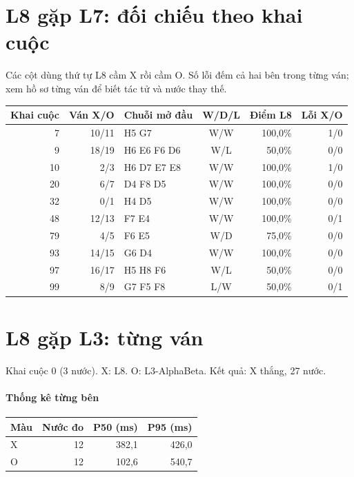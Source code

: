 \section{L8 gặp L7: đối chiếu theo khai cuộc}
Các cột dùng thứ tự L8 cầm X rồi cầm O. Số lỗi đếm cả hai bên trong từng ván; xem hồ sơ từng ván để biết tác tử và nước thay thế.
\begin{center}\small
\begin{tabular}{@{}rrlcrr@{}}
\toprule
Khai cuộc & Ván X/O & Chuỗi mở đầu & W/D/L & Điểm L8 & Lỗi X/O \\
\midrule
7 & 10/11 & H5 G7 & W/W & 100,0\% & 1/0 \\
9 & 18/19 & H6 E6 F6 D6 & W/L & 50,0\% & 0/0 \\
10 & 2/3 & H6 D7 E7 E8 & W/W & 100,0\% & 1/0 \\
20 & 6/7 & D4 F8 D5 & W/W & 100,0\% & 0/0 \\
32 & 0/1 & H4 D5 & W/W & 100,0\% & 0/0 \\
48 & 12/13 & F7 E4 & W/W & 100,0\% & 0/1 \\
79 & 4/5 & F6 E5 & W/D & 75,0\% & 0/0 \\
93 & 14/15 & G6 D4 & W/W & 100,0\% & 0/0 \\
97 & 16/17 & H5 H8 F6 & W/L & 50,0\% & 0/0 \\
99 & 8/9 & G7 F5 F8 & L/W & 50,0\% & 0/1 \\
\bottomrule
\end{tabular}
\end{center}
\section{L8 gặp L3: từng ván}
Khai cuộc 0 (3 nước). X: L8. O: L3-AlphaBeta. Kết quả: X thắng, 27 nước.
\paragraph{Thống kê từng bên}
\begin{center}\small
\begin{tabular}{@{}lrrr@{}}
\toprule
Màu & Nước đo & P50 (ms) & P95 (ms) \\
\midrule
X & 12 & 382,1 & 426,0 \\
O & 12 & 102,6 & 540,7 \\
\bottomrule
\end{tabular}
\end{center}
